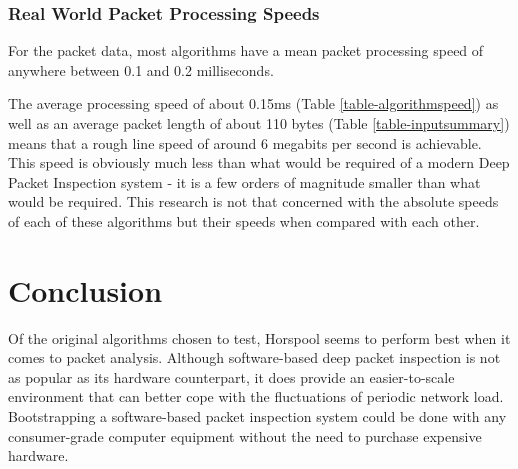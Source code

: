 \documentclass[11pt]{article}
\begin{document}
\subsubsection{Real World Packet Processing Speeds}

For the packet data, most algorithms have a mean packet processing speed of anywhere between 0.1 and 0.2 milliseconds.

The average processing speed of about 0.15ms (Table \ref{table-algorithmspeed}) as well as an average packet length of about 110 bytes (Table \ref{table-inputsummary}) means that a rough line speed of around 6 megabits per second is achievable. This speed is obviously much less than what would be required of a modern Deep Packet Inspection system - it is a few orders of magnitude smaller than what would be required. This research is not that concerned with the absolute speeds of each of these algorithms but their speeds when compared with each other. 

\section{Conclusion}

Of the original algorithms chosen to test, Horspool \citep{horspool1980} seems to perform best when it comes to packet analysis.
Although software-based deep packet inspection is not as popular as its hardware counterpart, it does provide an easier-to-scale environment that can better cope with the fluctuations of periodic network load. Bootstrapping a software-based packet inspection system could be done with any consumer-grade computer equipment without the need to purchase expensive hardware.



\end{document}

